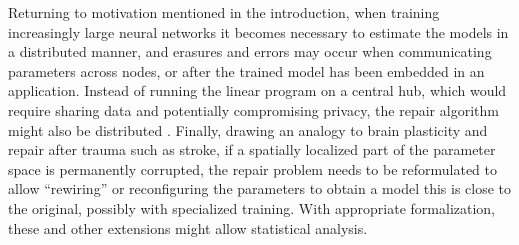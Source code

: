 Returning to motivation mentioned in the introduction, when training increasingly large neural networks
it becomes necessary to estimate the models in a distributed manner, and erasures and errors may occur when
communicating parameters across nodes, or after the trained model has been embedded in an application.
Instead of running the linear program on a central hub,
which would require sharing data and potentially compromising privacy, the repair algorithm
might also be distributed \citep{hong12}. Finally, drawing an analogy to brain plasticity and repair after trauma such as stroke, if a spatially localized part of the parameter space is permanently corrupted, the repair problem needs to be reformulated to allow ``rewiring'' or reconfiguring the parameters to obtain a model this is close to the original, possibly with specialized training. With appropriate formalization, these and other extensions might allow statistical analysis.
